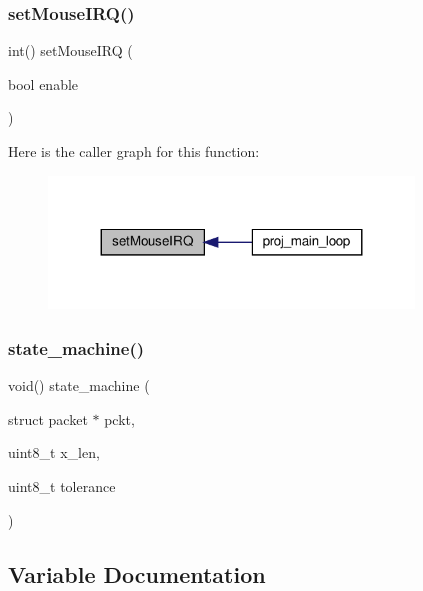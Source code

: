 \subsubsection{\texorpdfstring{set\+Mouse\+I\+R\+Q()}{setMouseIRQ()}}
{\footnotesize\ttfamily int() set\+Mouse\+I\+RQ (\begin{DoxyParamCaption}\item[{bool}]{enable }\end{DoxyParamCaption})}

Here is the caller graph for this function\+:\nopagebreak
\begin{figure}[H]
\begin{center}
\leavevmode
\includegraphics[width=275pt]{group__mouse_ga8931196769eb020bd34b8b93ee8c1ef6_icgraph}
\end{center}
\end{figure}
\mbox{\label{group__mouse_ga025476b3734400554e7ead9c841b9ed9}} 
\subsubsection{\texorpdfstring{state\+\_\+machine()}{state\_machine()}}
{\footnotesize\ttfamily void() state\+\_\+machine (\begin{DoxyParamCaption}\item[{struct packet $\ast$}]{pckt,  }\item[{uint8\+\_\+t}]{x\+\_\+len,  }\item[{uint8\+\_\+t}]{tolerance }\end{DoxyParamCaption})}



\subsection{Variable Documentation}
\mbox{\label{group__mouse_ga325819a8e492ac69542e8b31705af6e9}} 
